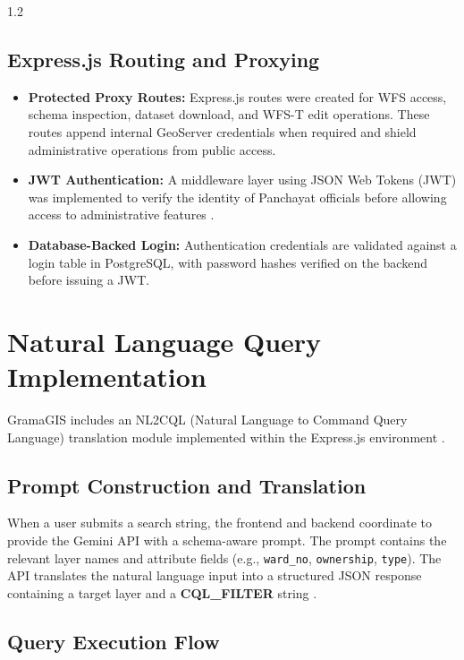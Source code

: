 \begin{spacing}{1.2}
\subsection*{Express.js Routing and Proxying}

\begin{itemize}
    \item \textbf{Protected Proxy Routes:} Express.js routes were created for WFS access, schema inspection, dataset download, and WFS-T edit operations. These routes append internal GeoServer credentials when required and shield administrative operations from public access.
    \item \textbf{JWT Authentication:} A middleware layer using JSON Web Tokens (JWT) was implemented to verify the identity of Panchayat officials before allowing access to administrative features \cite{smart_panchayat2023}.
    \item \textbf{Database-Backed Login:} Authentication credentials are validated against a login table in PostgreSQL, with password hashes verified on the backend before issuing a JWT.
\end{itemize}

\section{Natural Language Query Implementation}

GramaGIS includes an NL2CQL (Natural Language to Command Query Language) translation module implemented within the Express.js environment \cite{liu2025nalspatial}.

\subsection*{Prompt Construction and Translation}

When a user submits a search string, the frontend and backend coordinate to provide the Gemini API with a schema-aware prompt. The prompt contains the relevant layer names and attribute fields (e.g., \texttt{ward\_no}, \texttt{ownership}, \texttt{type}). The API translates the natural language input into a structured JSON response containing a target layer and a \textbf{CQL\_FILTER} string \cite{liu2025nalspatial}.

\subsection*{Query Execution Flow}


\end{spacing}
